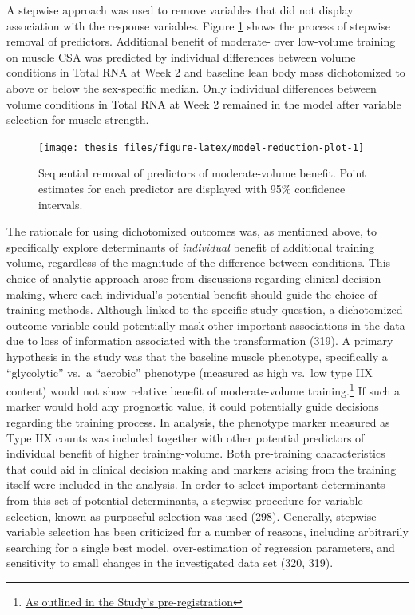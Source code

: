 \documentclass[twoside,10pt]{gihclass} %
\begin{document}
A stepwise approach was used to remove variables that did not display association with the response variables. Figure \ref{fig:model-reduction-plot} shows the process of stepwise removal of predictors.
Additional benefit of moderate- over low-volume training on muscle CSA was predicted by individual differences between volume conditions in Total RNA at Week 2 and baseline lean body mass dichotomized to above or below the sex-specific median.
Only individual differences between volume conditions in Total RNA at Week 2 remained in the model after variable selection for muscle strength.
\begin{figure}

{\centering \texttt{[image: thesis\_files/figure-latex/model-reduction-plot-1]} 

}

\caption[Step-wise variable selection of determinants of moderate- over low-volume training benefit.]{Sequential removal of predictors of moderate-volume benefit. Point estimates for each predictor are displayed with 95\% confidence intervals.}\label{fig:model-reduction-plot}
\end{figure}
The rationale for using dichotomized outcomes was, as mentioned above, to specifically explore determinants of \emph{individual} benefit of additional training volume, regardless of the magnitude of the difference between conditions.
This choice of analytic approach arose from discussions regarding clinical decision-making, where each individual's potential benefit should guide the choice of training methods.
Although linked to the specific study question, a dichotomized outcome variable could potentially mask other important associations in the data due to loss of information associated with the transformation
(319).
A primary hypothesis in the study was that the baseline muscle phenotype, specifically a ``glycolytic'' vs.~a ``aerobic'' phenotype (measured as high vs.~low type IIX content) would not show relative benefit of moderate-volume training.\footnote{\href{https://clinicaltrials.gov/ct2/show/NCT02179307?term=lillehammer\&draw=2\&rank=9}{As outlined in the Study's pre-registration}}
If such a marker would hold any prognostic value, it could potentially guide decisions regarding the training process.
In analysis, the phenotype marker measured as Type IIX counts was included together with other potential predictors of individual benefit of higher training-volume.
Both pre-training characteristics that could aid in clinical decision making and markers arising from the training itself were included in the analysis.
In order to select important determinants from this set of potential determinants, a stepwise procedure for variable selection, known as purposeful selection was used
(298).
Generally, stepwise variable selection has been criticized for a number of reasons, including arbitrarily searching for a single best model, over-estimation of regression parameters, and sensitivity to small changes in the investigated data set
(320, 319).
\end{document}
